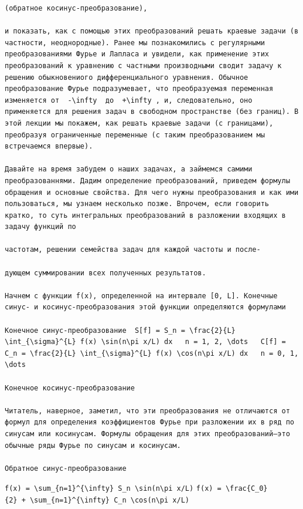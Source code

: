 \documentclass[
  ukrainian,
]{article}
\begin{document}
\begin{verbatim}
(обратное косинус-преобразование),

и показать, как с помощью этих преобразований решать краевые задачи (в частности, неоднородные). Ранее мы познакомились с регулярными преобразованиями Фурье и Лапласа и увидели, как применение этих преобразований к уравнению с частными производными сводит задачу к решению обыкновениого дифференциального уравнения. Обычное преобразование Фурье подразумевает, что преобразуемая переменная изменяется от  -\infty  до  +\infty , и, следовательно, оно применяется для решения задач в свободном пространстве (без границ). В этой лекции мы покажем, как решать краевые задачи (с границами), преобразуя ограниченные переменные (с таким преобразованием мы встречаемся впервые).

Давайте на время забудем о наших задачах, а займемся самими преобразованнями. Дадим определение преобразований, приведем формулы обращения и основные свойства. Для чего нужны преобразования и как ими пользоваться, мы узнаем несколько позже. Впрочем, если говорить кратко, то суть интегральных преобразований в разложении входящих в задачу функций по

частотам, решении семейства задач для каждой частоты и после-

дующем суммировании всех полученных результатов.

Начнем с функции f(x), определенной на интервале [0, L]. Конечные синус- и косинус-преобразования этой функции определяются формулами

Конечное синус-преобразование  S[f] = S_n = \frac{2}{L} \int_{\sigma}^{L} f(x) \sin(n\pi x/L) dx   n = 1, 2, \dots   C[f] = C_n = \frac{2}{L} \int_{\sigma}^{L} f(x) \cos(n\pi x/L) dx   n = 0, 1, \dots 

Конечное косинус-преобразование

Читатель, наверное, заметил, что эти преобразования не отличаются от формул для определения коэффициентов Фурье при разложении их в ряд по синусам или косинусам. Формулы обращения для этих преобразований—это обычные ряды Фурье по синусам и косинусам.

Обратное синус-преобразование
\end{verbatim}

\texttt{f(x)\ =\ \textbackslash{}sum\_\{n=1\}\^{}\{\textbackslash{}infty\}\ S\_n\ \textbackslash{}sin(n\textbackslash{}pi\ x/L)}
\texttt{f(x)\ =\ \textbackslash{}frac\{C\_0\}\{2\}\ +\ \textbackslash{}sum\_\{n=1\}\^{}\{\textbackslash{}infty\}\ C\_n\ \textbackslash{}cos(n\textbackslash{}pi\ x/L)}
\end{document}
